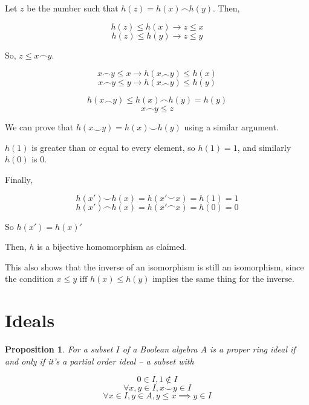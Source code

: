\documentclass{article}
\newtheorem*{proposition}{Proposition}
\begin{document}
    Let $z$ be the number such that $h(z) = h(x) \frown h(y)$. Then,

    \[h(z) \leq h(x) \rightarrow z \leq x\] \[h(z) \leq h(y) \rightarrow z \leq
    y\]

    So, $z \leq x \frown y$.

    \[x \frown y \leq x \rightarrow h(x \frown y) \leq h(x)\]
    \[x \frown y \leq y \rightarrow h(x \frown y) \leq h(y)\]

    \[h(x \frown y) \leq h(x) \frown h(y) = h(y)\]
    \[x \frown y \leq z\]

    We can prove that $h(x \smile y) = h(x) \smile h(y)$ using a similar
    argument.

    $h(1)$ is greater than or equal to every element, so $h(1) = 1$, and
    similarly $h(0)$ is $0$.

    Finally,

    \[h(x') \smile h(x) = h(x' \smile x) = h(1) = 1\]
    \[h(x') \frown h(x) = h(x' \frown x) = h(0) = 0\]

    So $h(x') = h(x)'$

    Then, $h$ is a bijective homomorphism as claimed.

    This also shows that the inverse of an isomorphism is still an isomorphism,
    since the condition $x \leq y \text{ iff } h(x) \leq h(y)$ implies the same
    thing for the inverse.

    \section{Ideals}


      \begin{proposition}

        For a subset $I$ of a Boolean algebra $A$ is a proper ring ideal if and
        only if it's a partial order ideal -- a subset with

        \[0 \in I, 1 \notin I\]
        \[\forall x, y \in I, x \smile y \in I\]
        \[\forall x \in I, y \in A, y \leq x \implies y \in I\]

      \end{proposition}
\end{document}
